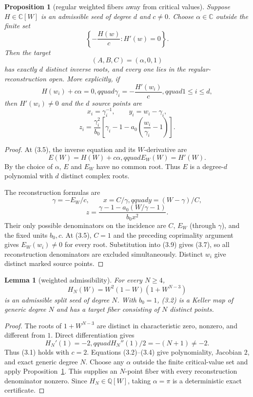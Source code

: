\documentclass[11pt]{article}
\newtheorem{lemma}[theorem]{Lemma}
\newtheorem{proposition}[theorem]{Proposition}
\newcommand{\C}{\mathbb C}
\begin{document}
\begin{proposition}[regular weighted fibers away from critical values]
\label{prop:weighted-explicit-fiber}
Suppose $H\in\C[W]$ is an admissible seed of degree $d$ and $c\ne0$.  Choose
$\alpha\in\C$ outside the finite set
\[
 \left\{-\frac{H(w)}c:H'(w)=0\right\}.
\]
Then the target
\[
 (A,B,C)=(\alpha,0,1)                                    \tag{3.5}
\]
has exactly $d$ distinct inverse roots, and every one lies in the
regular-reconstruction open.  More explicitly, if
\[
 H(w_i)+c\alpha=0,qquad
 \gamma_i=-\frac{H'(w_i)}c,qquad 1\le i\le d,           \tag{3.6}
\]
then $H'(w_i)\ne0$ and the $d$ source points are
\[
 x_i=\gamma_i^{-1},\qquad y_i=w_i-\gamma_i,
\]
\[
 z_i=\frac{\gamma_i^2}{b_0}
 \left[\gamma_i-1-a_0\left(\frac{w_i}{\gamma_i}-1\right)\right].
                                                                    \tag{3.7}
\]
\end{proposition}

\begin{proof}
At (3.5), the inverse equation and its $W$-derivative are
\[
 E(W)=H(W)+c\alpha,qquad E_W(W)=H'(W).                  \tag{3.8}
\]
By the choice of $\alpha$, $E$ and $E_W$ have no common root.  Thus $E$ is a
degree-$d$ polynomial with $d$ distinct complex roots.

The reconstruction formulas are
\[
 \gamma=-E_W/c,\qquad x=C/\gamma,qquad
 y=(W-\gamma)/C,
\]
\[
 z=\frac{\gamma-1-a_0(W/\gamma-1)}{b_0x^2}.             \tag{3.9}
\]
Their only possible denominators on the incidence are $C$, $E_W$ (through
$\gamma$), and the fixed units $b_0,c$.  At (3.5), $C=1$ and the preceding
coprimality argument gives $E_W(w_i)\ne0$ for every root.  Substitution into
(3.9) gives (3.7), so all reconstruction denominators are excluded
simultaneously.  Distinct $w_i$ give distinct marked source points.
\end{proof}

\begin{lemma}[weighted admissibility]\label{lem:weighted}
For every $N\ge4$,
\[
 H_N(W)=W^2(1-W)(1+W^{N-3})                              \tag{3.10}
\]
is an admissible split seed of degree $N$.  With $b_0=1$, (3.2) is a Keller
map of generic degree $N$ and has a target fiber consisting of $N$ distinct
points.
\end{lemma}

\begin{proof}
The roots of $1+W^{N-3}$ are distinct in characteristic zero, nonzero, and
different from $1$.  Direct differentiation gives
\[
 H_N'(1)=-2,qquad H_N''(1)/2=-(N+1)\ne-2.
\]
Thus (3.1) holds with $c=2$.  Equations (3.2)--(3.4) give polynomiality,
Jacobian $2$, and exact generic degree $N$.  Choose any $\alpha$ outside the
finite critical-value set and apply
Proposition~\ref{prop:weighted-explicit-fiber}.  This supplies an $N$-point
fiber with every reconstruction denominator nonzero.  Since
$H_N\in\mathbb Q[W]$, taking $\alpha=\pi$ is a deterministic exact
certificate.
\end{proof}
\end{document}
